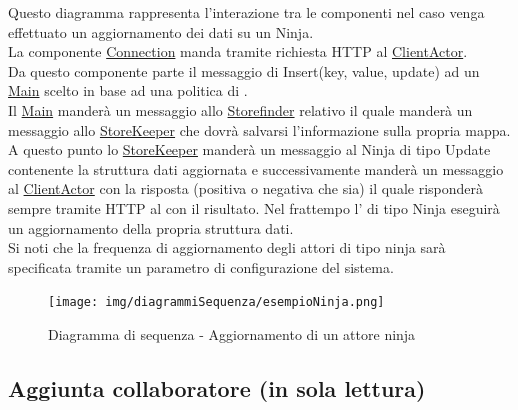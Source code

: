 \documentclass{scalatekids-article}
\begin{document}
Questo diagramma rappresenta l'interazione tra le componenti nel caso venga
effettuato un aggiornamento dei dati su un  Ninja.\\
La componente \hyperref[sec:actorbase::driver::client::Connection]{Connection}
manda tramite richiesta HTTP al \hyperref[sec:actorbase::actorsystem::actors::clientactor::ClientActor]{ClientActor}.\\
Da questo componente parte il messaggio di Insert(key, value, update) ad un \hyperref[sec:actorbase::actorsystem::actors::main::Main]{Main}
scelto in base ad una politica di .\\
Il \hyperref[sec:actorbase::actorsystem::actors::main::Main]{Main} manderà un messaggio allo
\hyperref[sec:actorbase::actorsystem::actors::storefinder::Storefinder]{Storefinder} relativo il quale manderà un messaggio
allo \hyperref[sec:actorbase::actorsystem::actors::storekeeper::Storekeeper]{StoreKeeper} che dovrà salvarsi l'informazione sulla propria mappa.\\
A questo punto lo \hyperref[sec:actorbase::actorsystem::actors::storekeeper::Storekeeper]{StoreKeeper} manderà un messaggio al Ninja di tipo
Update contenente la struttura dati aggiornata e successivamente manderà un messaggio al
\hyperref[sec:actorbase::actorsystem::actors::clientactor::ClientActor]{ClientActor} con la risposta (positiva o negativa che sia)
il quale risponderà sempre tramite HTTP al  con il risultato.
Nel frattempo l' di tipo Ninja eseguirà un aggiornamento della propria struttura dati.\\
Si noti che la frequenza di aggiornamento degli attori di tipo ninja sarà
specificata tramite un parametro di configurazione del sistema.
\begin{figure}[H]
  \begin{center}
    \texttt{[image: img/diagrammiSequenza/esempioNinja.png]}
    \caption{Diagramma di sequenza - Aggiornamento di un attore ninja}
  \end{center}
\end{figure}

\subsection{Aggiunta collaboratore (in sola lettura)}
\end{document}
